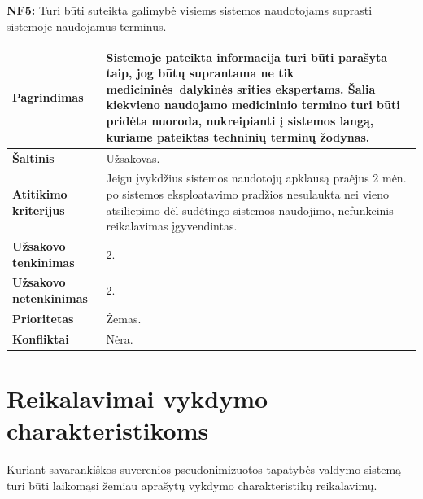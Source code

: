 \documentclass[12pt]{article}
\begin{document}
\noindent \textbf{NF5:} Turi būti suteikta galimybė visiems sistemos naudotojams
suprasti sistemoje naudojamus terminus.
\label{sec:NF5}
\begin{table}[htb!]
    \captionsetup{justification=centering}
    \vskip -10pt
    \begin{tabular}{|m{4.9cm}|m{11cm}|}
        \hline
        \raggedleft \textbf{\cellcolor{deepchampagne}Pagrindimas} &
        Sistemoje pateikta informacija turi būti parašyta taip, jog būtų
        suprantama ne tik medicininės dalykinės srities ekspertams. Šalia
        kiekvieno naudojamo medicininio termino turi būti pridėta nuoroda,
        nukreipianti į sistemos langą, kuriame pateiktas techninių terminų
        žodynas. \\
        \hline
        \raggedleft \textbf{\cellcolor{deepchampagne}Šaltinis} & Užsakovas. \\
        \hline
        \raggedleft \textbf{\cellcolor{deepchampagne}Atitikimo kriterijus} & 
        Jeigu įvykdžius sistemos naudotojų apklausą praėjus 2 mėn. po sistemos
        eksploatavimo pradžios nesulaukta nei vieno atsiliepimo dėl sudėtingo
        sistemos naudojimo, nefunkcinis reikalavimas įgyvendintas. \\
        \hline
        \raggedleft \textbf{\cellcolor{deepchampagne}Užsakovo tenkinimas} & 2. \\
        \hline
        \raggedleft \textbf{\cellcolor{deepchampagne}Užsakovo netenkinimas} & 2. \\
        \hline
        \raggedleft \textbf{\cellcolor{deepchampagne}Prioritetas} & Žemas. \\
        \hline
        \raggedleft \textbf{\cellcolor{deepchampagne}Konfliktai} & Nėra. \\
        \hline
    \end{tabular}
\end{table}

\newpage

\section{Reikalavimai vykdymo charakteristikoms}
Kuriant savarankiškos suverenios pseudonimizuotos tapatybės valdymo sistemą
turi būti laikomąsi žemiau aprašytų vykdymo charakteristikų reikalavimų.
\vskip 10pt
\end{document}
